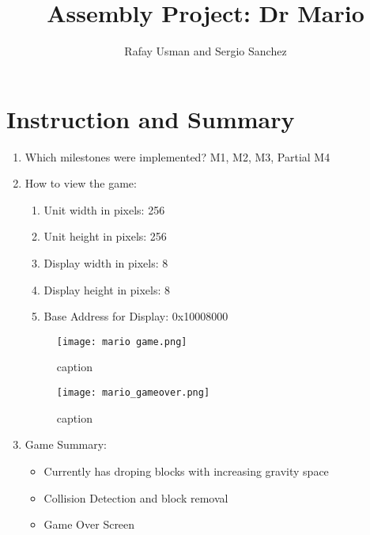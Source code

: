 \documentclass{article}
\title{Assembly Project: Dr Mario}
\date{}
\author{Rafay Usman and Sergio Sanchez}
\begin{document}
\maketitle
\section{Instruction and Summary}

\begin{enumerate}

    \item Which milestones were implemented? M1, M2, M3, Partial M4

    \item How to view the game:  
    \begin{enumerate}
    \item Unit width in pixels:       256
    \item Unit height in pixels:      256
    \item Display width in pixels:    8
    \item Display height in pixels:   8
    \item Base Address for Display:   0x10008000
    \end{enumerate}

    

\begin{figure}[ht!]
    \centering
    \texttt{[image: mario game.png]}
    \caption{caption}
    \label{Instructions}
\end{figure}



\begin{figure}[ht!]
    \centering
    \texttt{[image: mario\_gameover.png]}
    \caption{caption}
    \label{Instructions}
\end{figure}


\item Game Summary:
\begin{itemize}
    \item Currently has droping blocks with increasing gravity space
    \item Collision Detection and block removal
    \item Game Over Screen
\end{itemize}

    
\end{enumerate}
\end{document}
